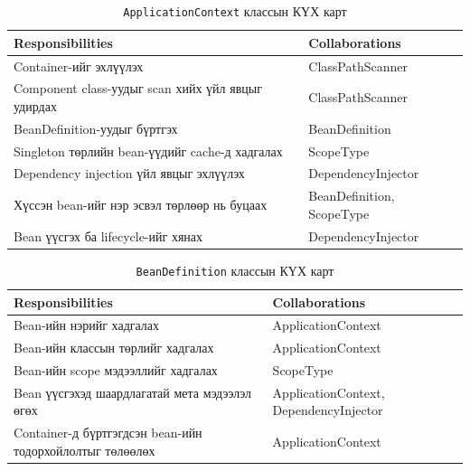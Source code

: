 \begin{table}[H]
\centering
\caption{\texttt{ApplicationContext} классын КҮХ карт}
\label{tab:crc-applicationcontext}
\renewcommand{\arraystretch}{1.3}
\begin{tabular}{|p{7cm}|p{7cm}|}
\hline
\textbf{Responsibilities} & \textbf{Collaborations} \\ \hline
Container-ийг эхлүүлэх & ClassPathScanner \\ \hline
Component class-уудыг scan хийх үйл явцыг удирдах & ClassPathScanner \\ \hline
BeanDefinition-уудыг бүртгэх & BeanDefinition \\ \hline
Singleton төрлийн bean-үүдийг cache-д хадгалах & ScopeType \\ \hline
Dependency injection үйл явцыг эхлүүлэх & DependencyInjector \\ \hline
Хүссэн bean-ийг нэр эсвэл төрлөөр нь буцаах & BeanDefinition, ScopeType \\ \hline
Bean үүсгэх ба lifecycle-ийг хянах & DependencyInjector \\ \hline
\end{tabular}
\end{table}

\begin{table}[H]
\centering
\caption{\texttt{BeanDefinition} классын КҮХ карт}
\label{tab:crc-beandefinition}
\renewcommand{\arraystretch}{1.3}
\begin{tabular}{|p{7cm}|p{7cm}|}
\hline
\textbf{Responsibilities} & \textbf{Collaborations} \\ \hline
Bean-ийн нэрийг хадгалах & ApplicationContext \\ \hline
Bean-ийн классын төрлийг хадгалах & ApplicationContext \\ \hline
Bean-ийн scope мэдээллийг хадгалах & ScopeType \\ \hline
Bean үүсгэхэд шаардлагатай мета мэдээлэл өгөх & ApplicationContext, DependencyInjector \\ \hline
Container-д бүртгэгдсэн bean-ийн тодорхойлолтыг төлөөлөх & ApplicationContext \\ \hline
\end{tabular}
\end{table}


